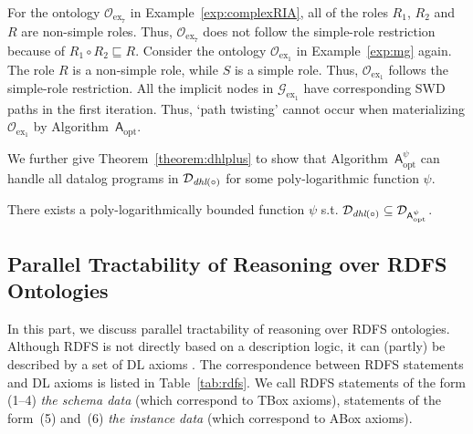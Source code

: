 \begin{example}
For the ontology $\mathcal{O}_{\text{ex}_7}$ in Example~\ref{exp:complexRIA}, all of the roles
$R_1$, $R_2$ and $R$ are non-simple roles. Thus, $\mathcal{O}_{\text{ex}_7}$ does not follow
the simple-role restriction because of $R_1\circ R_2\sqsubseteq R$.
Consider the ontology $\mathcal{O}_{\text{ex}_1}$
in Example~\ref{exp:mg} again. The role $R$ is a non-simple role, while $S$ is a simple role.
Thus, $\mathcal{O}_{\text{ex}_1}$ follows the simple-role restriction. All the implicit nodes
in $\mathcal{G}_{\text{ex}_1}$ have corresponding SWD paths in the first iteration.
Thus, `path twisting' cannot occur when materializing $\mathcal{O}_{\text{ex}_1}$ by Algorithm~$\mathsf{A}_{\text{opt}}$.
\end{example}

We further give Theorem~\ref{theorem:dhlplus} to show that Algorithm~$\mathsf{A}_{\text{opt}}^{\psi}$ can handle
all datalog programs in $\mathcal{D}_{\textit{\text{dhl}}(\circ)}$ for some poly-logarithmic function $\psi$.

\begin{theorem}\label{theorem:dhlplus}
There exists a poly-logarithmically bounded function $\psi$ s.t. $\mathcal{D}_{\textit{\text{dhl}}(\circ)}\subseteq\mathcal{D}_{\mathsf{A}_{\text{opt}}^{\psi}}$.
\end{theorem}

\subsection{Parallel Tractability of Reasoning over RDFS Ontologies}

In this part, we discuss parallel tractability of reasoning over RDFS ontologies.
Although RDFS is not directly based on a description logic, it can (partly) be described by a set of DL axioms \cite{GrosofHVD03}.
The correspondence between RDFS statements and DL axioms is listed in Table~\ref{tab:rdfs}.
We call RDFS statements of the form (1--4) \emph{the schema data}
(which correspond to TBox axioms), statements of the form~(5) and~(6)
\emph{the instance data} (which correspond to ABox axioms).

